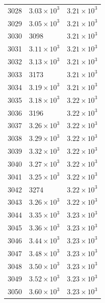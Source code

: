 \begin{table}[H]
\begin{tabular}{lll}
3028 & $\displaystyle 3.03 \times 10^{3}$ & $\displaystyle 3.21 \times 10^{3}$ \\
3029 & $\displaystyle 3.05 \times 10^{3}$ & $\displaystyle 3.21 \times 10^{3}$ \\
3030 & 3098 & $\displaystyle 3.21 \times 10^{3}$ \\
3031 & $\displaystyle 3.11 \times 10^{3}$ & $\displaystyle 3.21 \times 10^{3}$ \\
3032 & $\displaystyle 3.13 \times 10^{3}$ & $\displaystyle 3.21 \times 10^{3}$ \\
3033 & 3173 & $\displaystyle 3.21 \times 10^{3}$ \\
3034 & $\displaystyle 3.19 \times 10^{3}$ & $\displaystyle 3.21 \times 10^{3}$ \\
3035 & $\displaystyle 3.18 \times 10^{3}$ & $\displaystyle 3.22 \times 10^{3}$ \\
3036 & 3196 & $\displaystyle 3.22 \times 10^{3}$ \\
3037 & $\displaystyle 3.26 \times 10^{3}$ & $\displaystyle 3.22 \times 10^{3}$ \\
3038 & $\displaystyle 3.29 \times 10^{3}$ & $\displaystyle 3.22 \times 10^{3}$ \\
3039 & $\displaystyle 3.32 \times 10^{3}$ & $\displaystyle 3.22 \times 10^{3}$ \\
3040 & $\displaystyle 3.27 \times 10^{3}$ & $\displaystyle 3.22 \times 10^{3}$ \\
3041 & $\displaystyle 3.25 \times 10^{3}$ & $\displaystyle 3.22 \times 10^{3}$ \\
3042 & 3274 & $\displaystyle 3.22 \times 10^{3}$ \\
3043 & $\displaystyle 3.26 \times 10^{3}$ & $\displaystyle 3.22 \times 10^{3}$ \\
3044 & $\displaystyle 3.35 \times 10^{3}$ & $\displaystyle 3.23 \times 10^{3}$ \\
3045 & $\displaystyle 3.36 \times 10^{3}$ & $\displaystyle 3.23 \times 10^{3}$ \\
3046 & $\displaystyle 3.44 \times 10^{3}$ & $\displaystyle 3.23 \times 10^{3}$ \\
3047 & $\displaystyle 3.48 \times 10^{3}$ & $\displaystyle 3.23 \times 10^{3}$ \\
3048 & $\displaystyle 3.50 \times 10^{3}$ & $\displaystyle 3.23 \times 10^{3}$ \\
3049 & $\displaystyle 3.52 \times 10^{3}$ & $\displaystyle 3.23 \times 10^{3}$ \\
3050 & $\displaystyle 3.60 \times 10^{3}$ & $\displaystyle 3.23 \times 10^{3}$ \\

\end{tabular}
\end{table}
